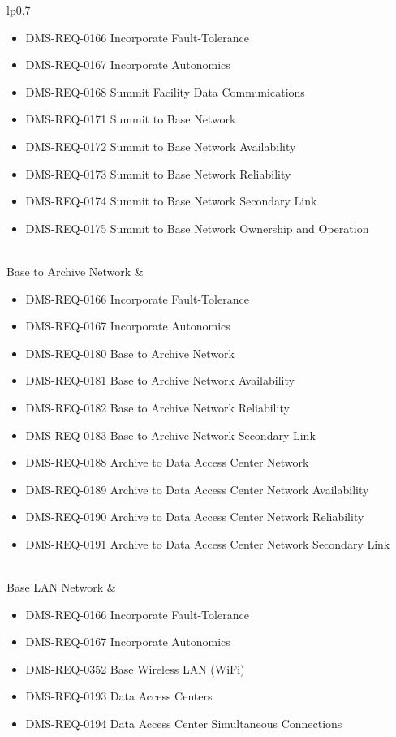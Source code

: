 \begin{xtabular}{lp{0.7\textwidth}}
\begin{itemize}
\item DMS-REQ-0166 Incorporate Fault-Tolerance
\item DMS-REQ-0167 Incorporate Autonomics
\item DMS-REQ-0168 Summit Facility Data Communications
\item DMS-REQ-0171 Summit to Base Network
\item DMS-REQ-0172 Summit to Base Network Availability
\item DMS-REQ-0173 Summit to Base Network Reliability
\item DMS-REQ-0174 Summit to Base Network Secondary Link
\item DMS-REQ-0175 Summit to Base Network Ownership and Operation
\end{itemize} \\ \hline
Base to Archive Network &
\begin{itemize}DMS-REQ-0165 Infrastructure Sizing for "catching up"
\item DMS-REQ-0166 Incorporate Fault-Tolerance
\item DMS-REQ-0167 Incorporate Autonomics
\item DMS-REQ-0180 Base to Archive Network
\item DMS-REQ-0181 Base to Archive Network Availability
\item DMS-REQ-0182 Base to Archive Network Reliability
\item DMS-REQ-0183 Base to Archive Network Secondary Link
\item DMS-REQ-0188 Archive to Data Access Center Network
\item DMS-REQ-0189 Archive to Data Access Center Network Availability
\item DMS-REQ-0190 Archive to Data Access Center Network Reliability
\item DMS-REQ-0191 Archive to Data Access Center Network Secondary Link
\end{itemize} \\ \hline
Base LAN Network &
\begin{itemize}DMS-REQ-0165 Infrastructure Sizing for "catching up"
\item DMS-REQ-0166 Incorporate Fault-Tolerance
\item DMS-REQ-0167 Incorporate Autonomics
\item DMS-REQ-0352 Base Wireless LAN (WiFi)
\item DMS-REQ-0193 Data Access Centers
\item DMS-REQ-0194 Data Access Center Simultaneous Connections

\end{itemize}
\end{xtabular}
